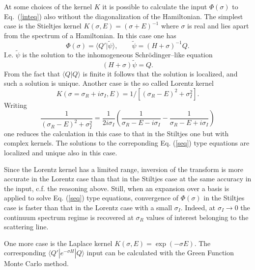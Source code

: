 \documentclass[12pt,ams,preprint,a4paper]{revtex4}
\begin{document}
At some choices of the kernel $K$ it is possible to calculate the input $\Phi(\sigma)$ to 
Eq.~(\ref{inteq}) also 
without the diagonalization of the Hamiltonian. The simplest case is the Stieltjes kernel
$K(\sigma,E)=(\sigma+E)^{-1}$ where $\sigma$ is real and lies apart from the spectrum of a Hamiltonian.
 In this case one has 
\begin{equation}
\Phi(\sigma)=\langle Q'|{\tilde \psi}\rangle,\qquad {\tilde \psi}=(H+\sigma)^{-1}Q.
\end{equation}
I.e. ${\tilde \psi}$ is the solution to the inhomogeneous Schr\"odinger--like equation
\begin{equation}
(H+\sigma){\tilde \psi}=Q.\label{seq}
\end{equation}
From the fact that $\langle Q|Q\rangle$ is finite it follows that the solution
is localized, and such a solution is unique. Another case is the so called Lorentz kernel
\begin{equation} 
K(\sigma=\sigma_R+i\sigma_I,E)=1/[(\sigma_R-E)^2+\sigma_I^2].
\end{equation}
Writing 
\begin{equation}
\frac{1}{(\sigma_R-E)^2+\sigma_I^2}=\frac{1}{2i\sigma_I}\left(\frac{1}{\sigma_R-E-i\sigma_I}-
\frac{1}{\sigma_R-E+i\sigma_I}\right)
\end{equation}
one reduces the calculation in this case to that in the Stiltjes one but with complex kernels.
The solutions to the correponding Eq. (\ref{seq}) type equations 
are localized and unique also in this case. 

Since the Lorentz kernel has a limited range,  inversion of the
 transform is more accurate in the Lorentz case than that in the Stiltjes case 
at the same accuracy in the input, c.f. the reasoning above. Still, when 
an expansion over a basis is applied to solve Eq. (\ref{seq}) type equations, convergence 
of $\Phi(\sigma)$
in the Stiltjes case  is faster  than that in the Lorentz case with a small $\sigma_I$.
Indeed, at $\sigma_I\rightarrow 0$ the continuum spectrum regime is recovered at $\sigma_R$ values
of interest belonging to the scattering line. 

One more case is the Laplace kernel $K(\sigma,E)=\exp(-\sigma E)$. The corresponding 
\mbox{$\langle Q'|e^{-\sigma H}|Q\rangle$} input
can be calculated with 
the Green Function Monte Carlo method. 
\end{document}
